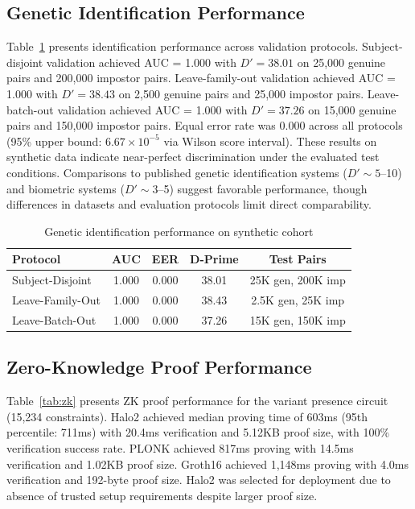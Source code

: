 \documentclass[11pt,letterpaper]{article}
\begin{document}
\subsection{Genetic Identification Performance}

Table~\ref{tab:identification} presents identification performance across validation protocols. Subject-disjoint validation achieved AUC = 1.000 with $D' = 38.01$ on 25,000 genuine pairs and 200,000 impostor pairs. Leave-family-out validation achieved AUC = 1.000 with $D' = 38.43$ on 2,500 genuine pairs and 25,000 impostor pairs. Leave-batch-out validation achieved AUC = 1.000 with $D' = 37.26$ on 15,000 genuine pairs and 150,000 impostor pairs. Equal error rate was 0.000 across all protocols (95\% upper bound: $6.67 \times 10^{-5}$ via Wilson score interval). These results on synthetic data indicate near-perfect discrimination under the evaluated test conditions. Comparisons to published genetic identification systems ($D' \sim 5$--10) and biometric systems ($D' \sim 3$--5) suggest favorable performance, though differences in datasets and evaluation protocols limit direct comparability.

\begin{table}[!ht]
\centering
\caption{Genetic identification performance on synthetic cohort}
\label{tab:identification}
\begin{tabular}{lcccc}
\toprule
\textbf{Protocol} & \textbf{AUC} & \textbf{EER} & \textbf{D-Prime} & \textbf{Test Pairs} \\
\midrule
Subject-Disjoint & 1.000 & 0.000 & 38.01 & 25K gen, 200K imp \\
Leave-Family-Out & 1.000 & 0.000 & 38.43 & 2.5K gen, 25K imp \\
Leave-Batch-Out & 1.000 & 0.000 & 37.26 & 15K gen, 150K imp \\
\bottomrule
\end{tabular}
\end{table}

\subsection{Zero-Knowledge Proof Performance}

Table~\ref{tab:zk} presents ZK proof performance for the variant presence circuit (15,234 constraints). Halo2 achieved median proving time of 603ms (95th percentile: 711ms) with 20.4ms verification and 5.12KB proof size, with 100\% verification success rate. PLONK achieved 817ms proving with 14.5ms verification and 1.02KB proof size. Groth16 achieved 1,148ms proving with 4.0ms verification and 192-byte proof size. Halo2 was selected for deployment due to absence of trusted setup requirements despite larger proof size.
\end{document}
